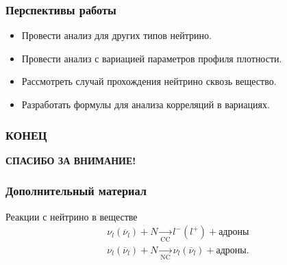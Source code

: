\documentclass[utf8,9pt,mathserif,usepdftitle=false]{beamer}
\begin{document}
\begin{frame}
	\frametitle{Перспективы работы}
	\begin{itemize}
  \item<1-> Провести анализ для других типов нейтрино.
  \item<2-> Провести анализ с вариацией параметров профиля плотности.
  \item<3-> Рассмотреть случай прохождения нейтрино сквозь вещество. 
  \item<3-> Разработать формулы для анализа корреляций в вариациях.
	\end{itemize}
\end{frame}

\begin{frame}
  \frametitle{КОНЕЦ}%
  \LARGE\centering\bfseries
  СПАСИБО ЗА ВНИМАНИЕ!
\end{frame}

\begin{frame}
  \frametitle{Дополнительный материал}%
  Реакции с нейтрино в веществе
  \begin{align*}
    \nu_{l}(\overline{\nu}_{l})+N\xrightarrow[\text{CC}]{}l^{-}(l^{+})+\text{адроны}\\[2ex]
    \nu_{l}(\overline{\nu}_{l})+N\xrightarrow[\text{NC}]{}\nu_{l}(\overline{\nu}_{l})+\text{адроны}.
  \end{align*}
\end{frame}
\end{document}
